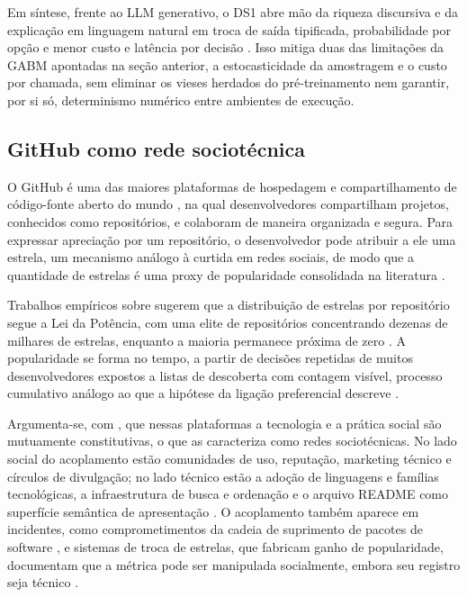 \documentclass[12pt,oneside,a4paper,brazil,sumario=tradicional]{abntex2}
\begin{document}
Em síntese, frente ao LLM generativo, o DS1 abre mão da riqueza discursiva e da explicação em linguagem natural em troca de saída tipificada, probabilidade por opção e menor custo e latência por decisão \parencite{typesafe2026, laya2026}. Isso mitiga duas das limitações da GABM apontadas na seção anterior, a estocasticidade da amostragem e o custo por chamada, sem eliminar os vieses herdados do pré-treinamento nem garantir, por si só, determinismo numérico entre ambientes de execução.

\subsection{GitHub como rede sociotécnica}

O GitHub é uma das maiores plataformas de hospedagem e compartilhamento de código-fonte aberto do mundo \parencite{github2025, stackoverflow2025}, na qual desenvolvedores compartilham projetos, conhecidos como repositórios, e colaboram de maneira organizada e segura. Para expressar apreciação por um repositório, o desenvolvedor pode atribuir a ele uma estrela, um mecanismo análogo à curtida em redes sociais, de modo que a quantidade de estrelas é uma proxy de popularidade consolidada na literatura \parencite{borges2016, borges2018, gu2026}.

Trabalhos empíricos sobre sugerem que a distribuição de estrelas por repositório segue a Lei da Potência, com uma elite de repositórios concentrando dezenas de milhares de estrelas, enquanto a maioria permanece próxima de zero \parencite{borges2018, gu2026}. A popularidade se forma no tempo, a partir de decisões repetidas de muitos desenvolvedores expostos a listas de descoberta com contagem visível, processo cumulativo análogo ao que a hipótese da ligação preferencial descreve \parencite{barabasi1999}.

Argumenta-se, com \textcite{orlikowski2008}, que nessas plataformas a tecnologia e a prática social são mutuamente constitutivas, o que as caracteriza como redes sociotécnicas. No lado social do acoplamento estão comunidades de uso, reputação, marketing técnico e círculos de divulgação; no lado técnico estão a adoção de linguagens e famílias tecnológicas, a infraestrutura de busca e ordenação e o arquivo README como superfície semântica de apresentação \parencite{jiang2017}. O acoplamento também aparece em incidentes, como comprometimentos da cadeia de suprimento de pacotes de software \parencite{saayman2026, dholakia2026}, e sistemas de troca de estrelas, que fabricam ganho de popularidade, documentam que a métrica pode ser manipulada socialmente, embora seu registro seja técnico \parencite{he2025b}.
\end{document}
